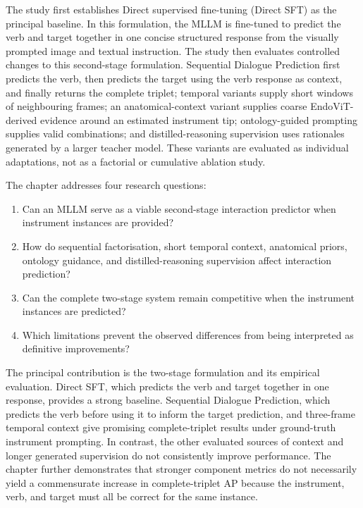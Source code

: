 The study first establishes Direct supervised fine-tuning (Direct SFT) as the principal baseline. In this formulation, the MLLM is fine-tuned to predict the verb and target together in one concise structured response from the visually prompted image and textual instruction. The study then evaluates controlled changes to this second-stage formulation. Sequential Dialogue Prediction first predicts the verb, then predicts the target using the verb response as context, and finally returns the complete triplet; temporal variants supply short windows of neighbouring frames; an anatomical-context variant supplies coarse EndoViT-derived evidence around an estimated instrument tip; ontology-guided prompting supplies valid \vtpair combinations; and distilled-reasoning supervision uses rationales generated by a larger teacher model. These variants are evaluated as individual adaptations, not as a factorial or cumulative ablation study.

The chapter addresses four research questions:
\begin{enumerate}
    \item Can an MLLM serve as a viable second-stage interaction predictor when instrument instances are provided?
    \item How do sequential factorisation, short temporal context, anatomical priors, ontology guidance, and distilled-reasoning supervision affect interaction prediction?
    \item Can the complete two-stage system remain competitive when the instrument instances are predicted?
    \item Which limitations prevent the observed differences from being interpreted as definitive improvements?
\end{enumerate}

The principal contribution is the two-stage formulation and its empirical evaluation. Direct SFT, which predicts the verb and target together in one response, provides a strong baseline. Sequential Dialogue Prediction, which predicts the verb before using it to inform the target prediction, and three-frame temporal context give promising complete-triplet results under ground-truth instrument prompting. In contrast, the other evaluated sources of context and longer generated supervision do not consistently improve performance. The chapter further demonstrates that stronger component metrics do not necessarily yield a commensurate increase in complete-triplet AP because the instrument, verb, and target must all be correct for the same instance.

